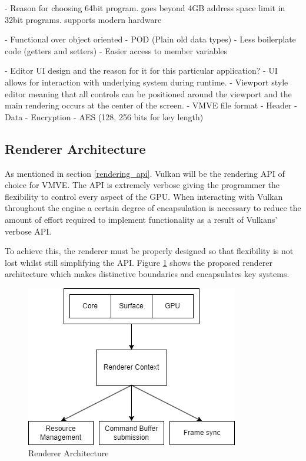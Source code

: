 \documentclass[11pt]{article}
\begin{document}
- Reason for choosing 64bit program.
    goes beyond 4GB address space limit in 32bit programs.
    supports modern hardware

- Functional over object oriented
-   POD (Plain old data types)
-   Less boilerplate code (getters and setters)
-   Easier access to member variables

- Editor UI design and the reason for it for this particular application?
-   UI allows for interaction with underlying system during runtime.
-   Viewport style editor meaning that all controls can be positioned
    around the viewport and the main rendering occurs at the center of
    the screen.
- VMVE file format
-    Header
-    Data
- Encryption
- AES (128, 256 bits for key length)



\subsection{Renderer Architecture}

As mentioned in section \ref{rendering_api}. Vulkan will be the rendering API of choice
for VMVE. The API is extremely verbose giving the programmer the flexibility to
control every aspect of the GPU. When interacting with Vulkan throughout the engine
a certain degree of encapsulation is necessary to reduce the amount of effort required to 
implement functionality as a result of Vulkans' verbose API.

To achieve this, the renderer must be properly designed so that flexibility is not lost
whilst still simplifying the API. Figure \ref{fig:rendererarch} shows the proposed renderer
architecture which makes distinctive boundaries and encapsulates key systems.

\begin{figure}[ht]
  \centering
  \includegraphics[width=\textwidth]{images/renderer_architecture.png}
  \caption{Renderer Architecture}
  \label{fig:rendererarch}
\end{figure}
\end{document}
